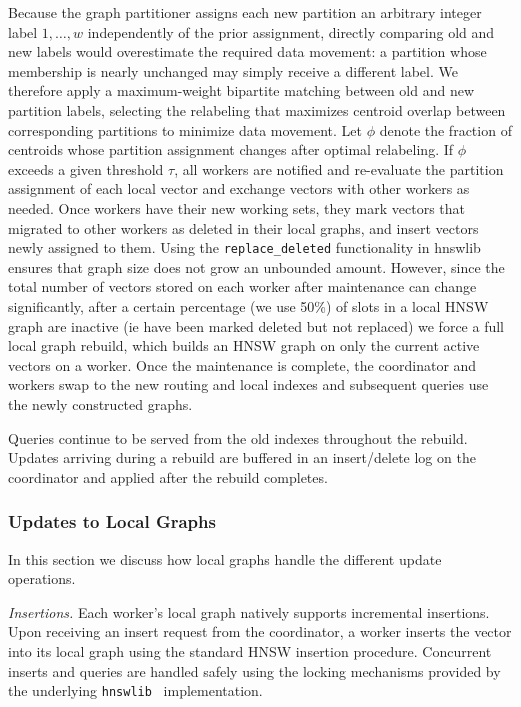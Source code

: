 \documentclass[sigconf,review,anonymous]{acmart}
\begin{document}
    Because the graph partitioner assigns each new partition an arbitrary integer label $1,\ldots,w$ independently of the prior assignment, directly comparing old and new labels would overestimate the required data movement: a partition whose membership is nearly unchanged may simply receive a different label. %
    We therefore apply a maximum-weight bipartite matching between old and new partition labels, selecting the relabeling that maximizes centroid overlap between corresponding partitions to minimize data movement. Let $\phi$ denote the fraction of centroids whose partition assignment changes after optimal relabeling. If $\phi$ exceeds a given threshold $\tau$, all workers are notified and re-evaluate the partition assignment of each local vector and exchange vectors with other workers as needed. Once workers have their new working sets, they mark vectors that migrated to other workers as deleted in their local graphs, and insert vectors newly assigned to them. Using the \texttt{replace\_deleted} functionality in hnswlib ensures that graph size does not grow an unbounded amount. However, since the total number of vectors stored on each worker after maintenance can change significantly, after a certain percentage (we use 50\%) of slots in a local HNSW graph are inactive (ie have been marked deleted but not replaced) we force a full local graph rebuild, which builds an HNSW graph on only the current active vectors on a worker. Once the maintenance is complete, the coordinator and workers swap to the new routing and local indexes and subsequent queries use the newly constructed graphs.

    Queries continue to be served from the old indexes throughout the rebuild. Updates arriving during a rebuild are buffered in an insert/delete log on the coordinator and applied after the rebuild completes.

\subsubsection{Updates to Local Graphs}
    In this section we discuss how local graphs handle the different update operations.

    \textit{Insertions.} Each worker's local graph natively supports incremental insertions. Upon receiving an insert request from the coordinator, a worker inserts the vector into its local graph using the standard HNSW insertion procedure. Concurrent inserts and queries are handled safely using the locking mechanisms provided by the underlying \texttt{hnswlib}~\cite{malkov2018efficient} implementation.
\end{document}
